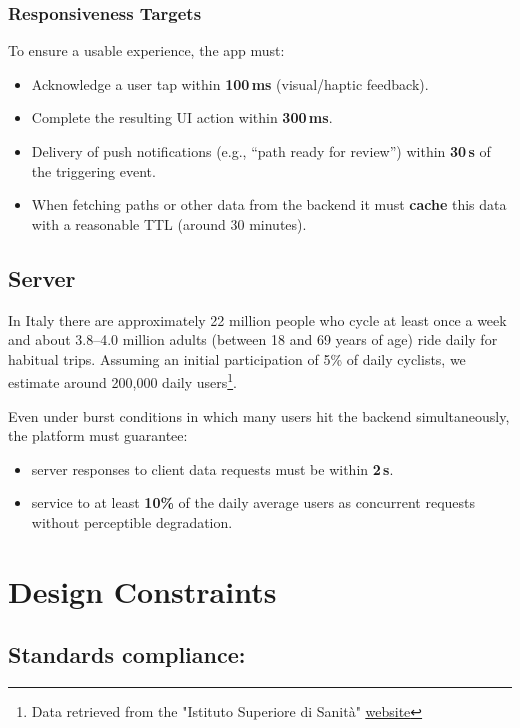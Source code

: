 \documentclass{Configuration_Files/PoliMi3i_thesis}
\begin{document}
\subsubsection{Responsiveness Targets }
To ensure a usable experience, the app must:
\begin{itemize}
  \item Acknowledge a user tap within \textbf{100\,ms} (visual/haptic feedback). 
  \item Complete the resulting UI action within \textbf{300\,ms}.
  \item Delivery of push notifications (e.g., ``path ready for review'') within \textbf{30\,s} of the triggering event.
  \item When fetching paths or other data from the backend it must \textbf{cache} this data with a reasonable TTL (around 30 minutes).
\end{itemize}

\subsection{Server}
In Italy there are approximately 22 million people who cycle at least once a week and about 3.8–4.0 million adults (between 18 and 69 years of age) ride daily for habitual trips. Assuming an initial participation of 5\% of daily cyclists, we estimate around 200,000 daily users\footnote{Data retrieved from the "Istituto Superiore di Sanità" 
\hyperlink{https://www.epicentro.iss.it/passi/dati/mobilita-attiva}{\underline{website}}}.

Even under burst conditions in which many users hit the backend simultaneously, the platform must guarantee:
\begin{itemize}
  \item server responses to client data requests must be within \textbf{2\,s}.
  \item service to at least \textbf{10\%} of the daily average users as concurrent requests without perceptible degradation.
\end{itemize}

\newpage
\section{Design Constraints}
\subsection{Standards compliance:}
\end{document}
